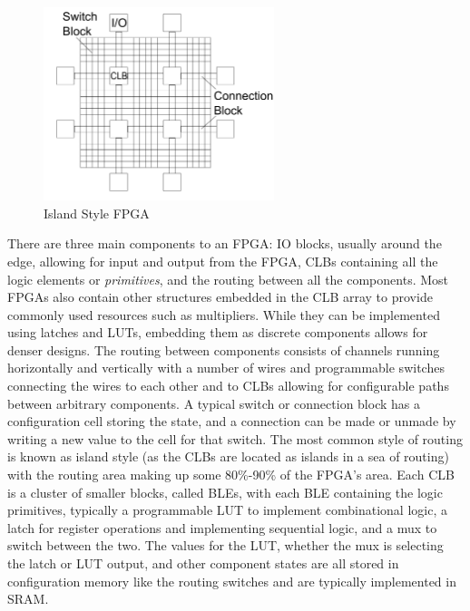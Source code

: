 \documentclass[12pt,final,oneside]{dwThesis} %
\begin{document}
   \begin{figure}
      \begin{center}
         \includegraphics[width=0.6\textwidth]{images/ArchFull.pdf}
         \caption{Island Style FPGA}
         \label{FPGAArch}
      \end{center}
   \end{figure}

   There are three main components to an \ac{FPGA}: \ac{IO} blocks, usually around the edge, allowing for input and output from the \ac{FPGA}, \acp{CLB} containing all the logic elements or \textit{primitives}, and the routing between all the components.
   Most \acp{FPGA} also contain other structures embedded in the \ac{CLB} array to provide commonly used resources such as multipliers. While they can be implemented using latches and \acp{LUT}, embedding them as discrete components allows for denser designs.
   The routing between components consists of channels running horizontally and vertically with a number of wires and programmable switches connecting the wires to each other and to \acp{CLB} allowing for configurable paths between arbitrary components. A typical switch or connection block has a configuration cell storing the state, and a connection can be made or unmade by writing a new value to the cell for that switch. The most common style of routing is known as island style (as the \acp{CLB} are located as islands in a sea of routing) with the routing area making up some 80\%-90\% of the \ac{FPGA}'s area\cite{FPGAArch}.
   Each \ac{CLB} is a cluster of smaller blocks, called \acp{BLE}, with each \ac{BLE} containing the logic primitives, typically a programmable \ac{LUT} to implement combinational logic, a latch for register operations and implementing sequential logic, and a \ac{mux} to switch between the two. The values for the \ac{LUT}, whether the \ac{mux} is selecting the latch or \ac{LUT} output, and other component states are all stored in configuration memory like the routing switches and are typically implemented in \acs{SRAM}.
\end{document}
